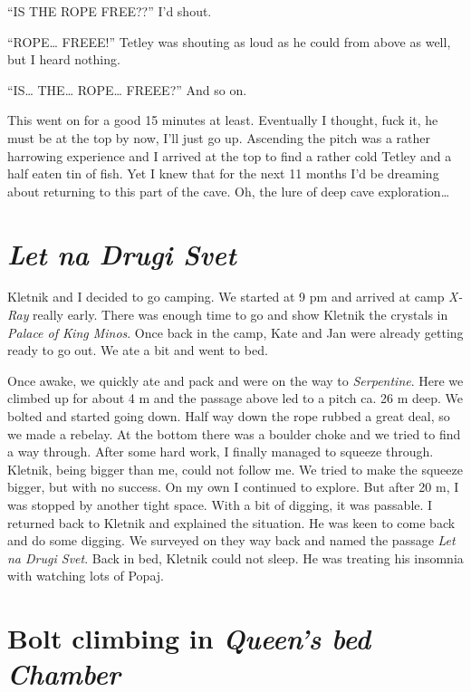 ``IS THE ROPE FREE??'' I'd shout.

``ROPE\ldots{} FREEE!'' Tetley was shouting as loud as he could from
above as well, but I heard nothing.

``IS\ldots{} THE\ldots{} ROPE\ldots{} FREEE?'' And so on.

This went on for a good 15 minutes at least. Eventually I thought, fuck
it, he must be at the top by now, I'll just go up. Ascending the pitch
was a rather harrowing experience and I arrived at the top to find a
rather cold Tetley and a half eaten tin of fish. Yet I knew that for the
next 11 months I'd be dreaming about returning to this part of the cave.
Oh, the lure of deep cave exploration\ldots{}


\hypertarget{let-na-drugi-svet}{%
\section{\texorpdfstring{\emph{Let na Drugi
Svet}}{Let na Drugi Svet}}\label{let-na-drugi-svet}}

Kletnik and I decided to go camping. We started at 9 pm and arrived at
camp \emph{X-Ray} really early. There was enough time to go and show
Kletnik the crystals in \emph{Palace of King Minos}. Once back in the
camp, Kate and Jan were already getting ready to go out. We ate a bit
and went to bed.

Once awake, we quickly ate and pack and were on the way to
\emph{Serpentine}. Here we climbed up for about 4 m and the passage
above led to a pitch ca. 26 m deep. We bolted and started going down.
Half way down the rope rubbed a great deal, so we made a rebelay. At the
bottom there was a boulder choke and we tried to find a way through.
After some hard work, I finally managed to squeeze through. Kletnik,
being bigger than me, could not follow me. We tried to make the squeeze
bigger, but with no success. On my own I continued to explore. But after
20 m, I was stopped by another tight space. With a bit of digging, it
was passable. I returned back to Kletnik and explained the situation. He
was keen to come back and do some digging. We surveyed on they way back
and named the passage \emph{Let na Drugi Svet}. Back in bed, Kletnik
could not sleep. He was treating his insomnia with watching lots of
Popaj.

\attrib{\izi}

\hypertarget{bolt-climbing-in-queens-bed-chamber}{%
\section{\texorpdfstring{Bolt climbing in \emph{Queen's bed
Chamber}}{Bolt climbing in Queen's bed Chamber}}\label{bolt-climbing-in-queens-bed-chamber}}

